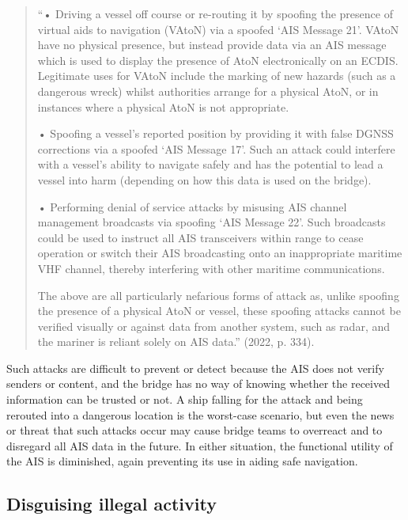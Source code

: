 \documentclass[
]{article}
\begin{document}
\begin{quote}
``• Driving a vessel off course or re-routing it by spoofing the
presence of virtual aids to navigation (VAtoN) via a spoofed `AIS
Message 21'. VAtoN have no physical presence, but instead provide data
via an AIS message which is used to display the presence of AtoN
electronically on an ECDIS. Legitimate uses for VAtoN include the
marking of new hazards (such as a dangerous wreck) whilst authorities
arrange for a physical AtoN, or in instances where a physical AtoN is
not appropriate.

• Spoofing a vessel's reported position by providing it with false DGNSS
corrections via a spoofed `AIS Message 17'. Such an attack could
interfere with a vessel's ability to navigate safely and has the
potential to lead a vessel into harm (depending on how this data is used
on the bridge).

• Performing denial of service attacks by misusing AIS channel
management broadcasts via spoofing `AIS Message 22'. Such broadcasts
could be used to instruct all AIS transceivers within range to cease
operation or switch their AIS broadcasting onto an inappropriate
maritime VHF channel, thereby interfering with other maritime
communications.

The above are all particularly nefarious forms of attack as, unlike
spoofing the presence of a physical AtoN or vessel, these spoofing
attacks cannot be verified visually or against data from another system,
such as radar, and the mariner is reliant solely on AIS data.'' (2022,
p. 334).
\end{quote}

Such attacks are difficult to prevent or detect because the AIS does not
verify senders or content, and the bridge has no way of knowing whether
the received information can be trusted or not. A ship falling for the
attack and being rerouted into a dangerous location is the worst-case
scenario, but even the news or threat that such attacks occur may cause
bridge teams to overreact and to disregard all AIS data in the future.
In either situation, the functional utility of the AIS is diminished,
again preventing its use in aiding safe navigation.

\hypertarget{disguising-illegal-activity}{%
\subsection{Disguising illegal
activity}\label{disguising-illegal-activity}}
\end{document}
